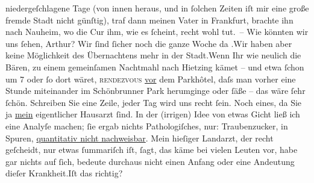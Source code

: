 \begin{ledgroupsized}[t]{13cm}
               niedergeſchlagene Tage (von innen heraus, und in ſolchen Zeiten iſt mir eine große
               fremde Stadt nicht günſtig), traf dann meinen Vater in Frankfurt,
               brachte ihn nach Nauheim, wo die Cur ihm, wie es
               ſcheint, recht wohl tut. – Wie {\pb}könnten wir uns ſehen, Arthur? Wir ſind ſicher noch die ganze Woche da \label{K_L02182_3v}\label{K_L02182_3h}.\hspace*{1.5em}Wir haben aber keine Möglichkeit des Übernachtens mehr
               in der Stadt.\hspace*{1.5em}Wenn Ihr wie neulich die Bären, zu einem gemeinſamen Nachtmahl nach
                  Hietzing kämet – und etwa ſchon um 7
               oder ſo dort wäret, \textsc{rendezvous}{ }\uline{vor} dem Parkhôtel,
               daſs man {\pb}vorher eine Stunde
               miteinander im Schönbrunner Park herumginge oder
               ſäße – das wäre ſehr ſchön. Schreiben Sie eine Zeile, jeder Tag wird uns recht
               ſein.\pend
           \pstart
           Noch eines, da Sie ja \uline{mein} eigentlicher Hausarzt
               ſind. In der (irrigen) Idee von etwas Gicht ließ ich eine Analyſe machen; ſie ergab
               nichts Pathologiſches, nur: Traubenzucker,  in
               Spuren, {\pb}\uline{quantitativ nicht nachweisbar}. Mein hieſiger Landarzt, der recht geſcheidt,
               nur etwas ſummariſch iſt, ſagt, das käme bei vielen Leuten vor, habe gar nichts auf
               ſich, bedeute durchaus nicht einen Anfang oder eine Andeutung dieſer Krankheit.\hspace*{1.5em}Iſt das richtig?\pend

\end{ledgroupsized}
